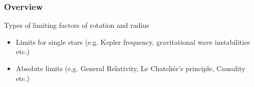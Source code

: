\begin{frame}
\frametitle{Overview}

\begin{block}{Types of limiting factors of rotation and radius}
	\begin{itemize}
		\item Limits for single stars (e.g. Kepler frequency, gravitational wave instabilities etc.)
		\item Absolute limits (e.g. General Relativity, Le Chateliér's principle, Causality etc.)
	\end{itemize}
\end{block}


\end{frame}
